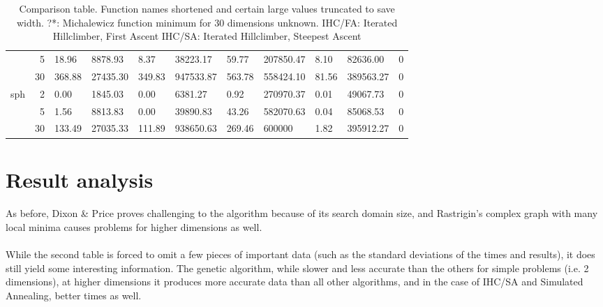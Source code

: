 \documentclass{article}
\begin{document}
\begin{table}[!h]
{\begin{tabular}{rr|llllllll|l}
                                        & 5                  & 18.96        & 8878.93     & 8.37        & 38223.17     & 59.77           & 207850.47        & 8.10        & 82636.00      & 0                       \\
                                        & 30                 & 368.88       & 27435.30    & 349.83      & 947533.87    & 563.78          & 558424.10        & 81.56       & 389563.27     & 0                       \\
        \multirow{3}{*}{sph}         & 2                  & 0.00         & 1845.03     & 0.00        & 6381.27      & 0.92            & 270970.37        & 0.01        & 49067.73      & 0                       \\
                                        & 5                  & 1.56         & 8813.83     & 0.00        & 39890.83     & 43.26           & 582070.63        & 0.04        & 85068.53      & 0                       \\
                                        & 30                 & 133.49       & 27035.33    & 111.89      & 938650.63    & 269.46          & 600000     & 1.82        & 395912.27     & 0                      
        \end{tabular}
        }
        \caption{Comparison table. Function names shortened and certain large values truncated to save width.
        \newline
        ?*: Michalewicz function minimum for 30 dimensions unknown.
        \newline
        IHC/FA: Iterated Hillclimber, First Ascent
        \newline
        IHC/SA: Iterated Hillclimber, Steepest Ascent}
    \end{table}

    \section{Result analysis}
    \paragraph{}
    As before, Dixon \& Price proves challenging to the algorithm because of its search domain size, and Rastrigin's complex graph with many local minima causes problems for higher dimensions as well. 
    \paragraph{}
    While the second table is forced to omit a few pieces of important data (such as the standard deviations of the times and results), it does still yield some interesting information. The genetic algorithm, while slower and less accurate than the others for simple problems (i.e. 2 dimensions), at higher dimensions it produces more accurate data than all other algorithms, and in the case of IHC/SA and Simulated Annealing, better times as well.
\end{document}
